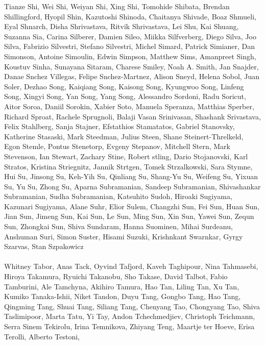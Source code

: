 \documentclass[11pt]{article}
\begin{document}
\begin{description}[itemsep=4mm, style=nextline]
Tianze Shi, 
Wei Shi, 
Weiyan Shi, 
Xing Shi, 
Tomohide Shibata, 
Brendan Shillingford, 
Hyopil Shin, 
Kazutoshi Shinoda, 
Chaitanya Shivade, 
Boaz Shmueli, 
Eyal Shnarch, 
Disha Shrivastava, 
Ritvik Shrivastava, 
Lei Shu, 
Kai Shuang, 
Suzanna Sia, 
Carina Silberer, 
Damien Sileo, 
Miikka Silfverberg, 
Diego Silva, 
Joo Silva, 
Fabrizio Silvestri, 
Stefano Silvestri, 
Michel Simard, 
Patrick Simianer, 
Dan Simonson, 
Antoine Simoulin, 
Edwin Simpson, 
Matthew Sims, 
Amanpreet Singh, 
Koustuv Sinha, 
Sunayana Sitaram, 
Charese Smiley, 
Noah A. Smith, 
Jan Snajder, 
Danae Snchez Villegas, 
Felipe Snchez-Martnez, 
Alison Sneyd, 
Helena Sobol, 
Juan Soler, 
Dezhao Song, 
Kaiqiang Song, 
Kaisong Song, 
Kyungwoo Song, 
Linfeng Song, 
Xingyi Song, 
Yan Song, 
Yang Song, 
Alessandro Sordoni, 
Radu Soricut, 
Aitor Soroa, 
Daniil Sorokin, 
Xabier Soto, 
Manuela Speranza, 
Matthias Sperber, 
Richard Sproat, 
Rachele Sprugnoli, 
Balaji Vasan Srinivasan, 
Shashank Srivastava, 
Felix Stahlberg, 
Sanja Stajner, 
Efstathios Stamatatos, 
Gabriel Stanovsky, 
Katherine Stasaski, 
Mark Steedman, 
Julius Steen, 
Shane Steinert-Threlkeld, 
Egon Stemle, 
Pontus Stenetorp, 
Evgeny Stepanov, 
Mitchell Stern, 
Mark Stevenson, 
Ian Stewart, 
Zachary Stine, 
Robert stling, 
Dario Stojanovski, 
Karl Stratos, 
Kristina Striegnitz, 
Jannik Strtgen, 
Tomek Strzalkowski, 
Sara Stymne, 
Hui Su, 
Jinsong Su, 
Keh-Yih Su, 
Qinliang Su, 
Shang-Yu Su, 
Weifeng Su, 
Yixuan Su, 
Yu Su, 
Zhong Su, 
Aparna Subramanian, 
Sandeep Subramanian, 
Shivashankar Subramanian, 
Sudha Subramanian, 
Katsuhito Sudoh, 
Hiroaki Sugiyama, 
Kazunari Sugiyama, 
Alane Suhr, 
Elior Sulem, 
Changzhi Sun, 
Fei Sun, 
Huan Sun, 
Jian Sun, 
Jimeng Sun, 
Kai Sun, 
Le Sun, 
Ming Sun, 
Xin Sun, 
Yawei Sun, 
Zequn Sun, 
Zhongkai Sun, 
Shiva Sundaram, 
Hanna Suominen, 
Mihai Surdeanu, 
Anshuman Suri, 
Simon Suster, 
Hisami Suzuki, 
Krishnkant Swarnkar, 
Gyrgy Szarvas, 
Stan Szpakowicz
\\
\\
Whitney Tabor, 
Anas Tack, 
Oyvind Tafjord, 
Kaveh Taghipour, 
Nina Tahmasebi, 
Hiroya Takamura, 
Ryuichi Takanobu, 
Sho Takase, 
David Talbot, 
Fabio Tamburini, 
Ale Tamchyna, 
Akihiro Tamura, 
Hao Tan, 
Liling Tan, 
Xu Tan, 
Kumiko Tanaka-Ishii, 
Niket Tandon, 
Duyu Tang, 
Gongbo Tang, 
Hao Tang, 
Qingming Tang, 
Shuai Tang, 
Siliang Tang, 
Chenyang Tao, 
Chongyang Tao, 
Shiva Taslimipoor, 
Marta Tatu, 
Yi Tay, 
Andon Tchechmedjiev, 
Christoph Teichmann, 
Serra Sinem Tekirolu, 
Irina Temnikova, 
Zhiyang Teng, 
Maartje ter Hoeve, 
Erisa Terolli, 
Alberto Testoni, 

\end{description}
\end{document}

